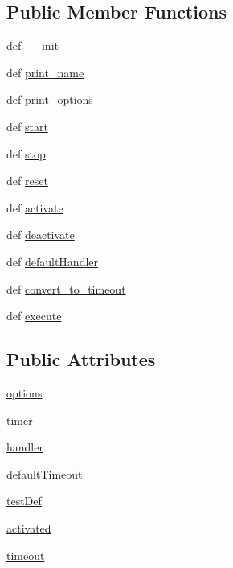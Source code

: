 \subsection*{Public Member Functions}
\begin{DoxyCompactItemize}
\item 
def \hyperlink{class_watchdog_1_1_watchdog_aa1f4dbdbd309300a402765a051ec0a53}{\-\_\-\-\_\-init\-\_\-\-\_\-}
\item 
def \hyperlink{class_watchdog_1_1_watchdog_a9b6386067421696fd9ff0f3aea52c9a4}{print\-\_\-name}
\item 
def \hyperlink{class_watchdog_1_1_watchdog_a5368c099a18a43a367ca38191d7286f7}{print\-\_\-options}
\item 
def \hyperlink{class_watchdog_1_1_watchdog_a0ddb7a85fbdad4cff3af0fe3628098f7}{start}
\item 
def \hyperlink{class_watchdog_1_1_watchdog_af56d743f19894122322a238de2bb36c7}{stop}
\item 
def \hyperlink{class_watchdog_1_1_watchdog_ae4c28ad104e774e68874a3129762ae8c}{reset}
\item 
def \hyperlink{class_watchdog_1_1_watchdog_a3d832cad81328a1c259015e8c68c16d9}{activate}
\item 
def \hyperlink{class_watchdog_1_1_watchdog_a2d1d443fe10d34903950dabb8d54ca67}{deactivate}
\item 
def \hyperlink{class_watchdog_1_1_watchdog_ac8a0d09157f34dc021ffc0753750cfc9}{default\-Handler}
\item 
def \hyperlink{class_watchdog_1_1_watchdog_ad7d2edaf53bf4fa24061d88448fea058}{convert\-\_\-to\-\_\-timeout}
\item 
def \hyperlink{class_watchdog_1_1_watchdog_a2d051635bc61c3f75ea7c2fbeed426b5}{execute}
\end{DoxyCompactItemize}
\subsection*{Public Attributes}
\begin{DoxyCompactItemize}
\item 
\hyperlink{class_watchdog_1_1_watchdog_a5ceb06fde29b89623d7a230ae080abe6}{options}
\item 
\hyperlink{class_watchdog_1_1_watchdog_ae03efeba550ed8039ab79a8414b8be82}{timer}
\item 
\hyperlink{class_watchdog_1_1_watchdog_af71309fe4f1c03b0b60d13cdb2f71575}{handler}
\item 
\hyperlink{class_watchdog_1_1_watchdog_a8e50eb419e58d250fc32011f33dfd6b7}{default\-Timeout}
\item 
\hyperlink{class_watchdog_1_1_watchdog_abc547688f9ff2ab9350b028c6f122997}{test\-Def}
\item 
\hyperlink{class_watchdog_1_1_watchdog_ab78c4b2339ad2efec784a3df0a5f37d6}{activated}
\item 
\hyperlink{class_watchdog_1_1_watchdog_a62dc7dad113fcda93fe4f8855ac037db}{timeout}
\end{DoxyCompactItemize}


